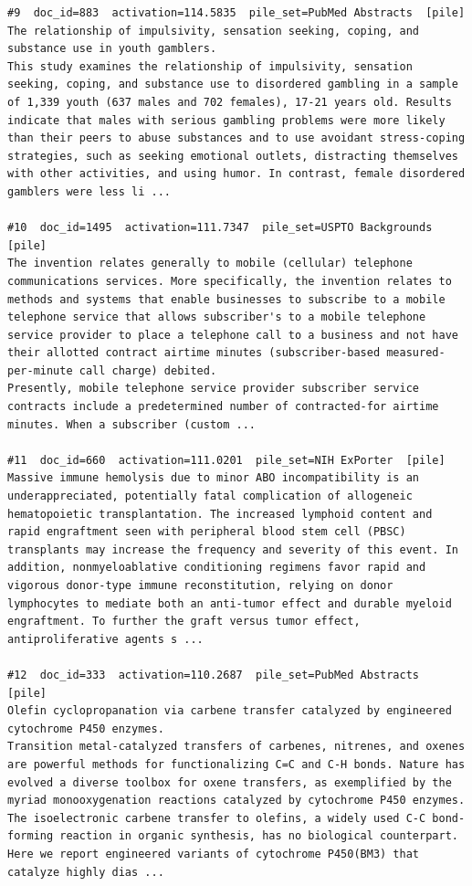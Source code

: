 \begin{verbatim}
#9  doc_id=883  activation=114.5835  pile_set=PubMed Abstracts  [pile]
The relationship of impulsivity, sensation seeking, coping, and substance use in youth gamblers.
This study examines the relationship of impulsivity, sensation seeking, coping, and substance use to disordered gambling in a sample of 1,339 youth (637 males and 702 females), 17-21 years old. Results indicate that males with serious gambling problems were more likely than their peers to abuse substances and to use avoidant stress-coping strategies, such as seeking emotional outlets, distracting themselves with other activities, and using humor. In contrast, female disordered gamblers were less li ...

#10  doc_id=1495  activation=111.7347  pile_set=USPTO Backgrounds  [pile]
The invention relates generally to mobile (cellular) telephone communications services. More specifically, the invention relates to methods and systems that enable businesses to subscribe to a mobile telephone service that allows subscriber's to a mobile telephone service provider to place a telephone call to a business and not have their allotted contract airtime minutes (subscriber-based measured-per-minute call charge) debited.
Presently, mobile telephone service provider subscriber service contracts include a predetermined number of contracted-for airtime minutes. When a subscriber (custom ...

#11  doc_id=660  activation=111.0201  pile_set=NIH ExPorter  [pile]
Massive immune hemolysis due to minor ABO incompatibility is an underappreciated, potentially fatal complication of allogeneic hematopoietic transplantation. The increased lymphoid content and rapid engraftment seen with peripheral blood stem cell (PBSC) transplants may increase the frequency and severity of this event. In addition, nonmyeloablative conditioning regimens favor rapid and vigorous donor-type immune reconstitution, relying on donor lymphocytes to mediate both an anti-tumor effect and durable myeloid engraftment. To further the graft versus tumor effect, antiproliferative agents s ...

#12  doc_id=333  activation=110.2687  pile_set=PubMed Abstracts  [pile]
Olefin cyclopropanation via carbene transfer catalyzed by engineered cytochrome P450 enzymes.
Transition metal-catalyzed transfers of carbenes, nitrenes, and oxenes are powerful methods for functionalizing C=C and C-H bonds. Nature has evolved a diverse toolbox for oxene transfers, as exemplified by the myriad monooxygenation reactions catalyzed by cytochrome P450 enzymes. The isoelectronic carbene transfer to olefins, a widely used C-C bond-forming reaction in organic synthesis, has no biological counterpart. Here we report engineered variants of cytochrome P450(BM3) that catalyze highly dias ...


\end{verbatim}
